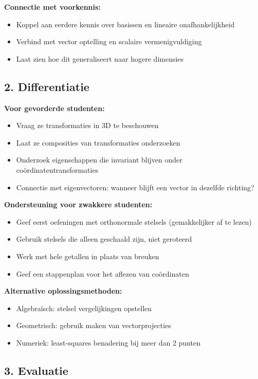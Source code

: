 \documentclass{ximera}
\begin{document}
\textbf{Connectie met voorkennis:}
\begin{itemize}
\item Koppel aan eerdere kennis over basissen en lineaire onafhankelijkheid
\item Verbind met vector optelling en scalaire vermenigvuldiging
\item Laat zien hoe dit generaliseert naar hogere dimensies
\end{itemize}

\subsection*{2. Differentiatie}

\textbf{Voor gevorderde studenten:}
\begin{itemize}
\item Vraag ze transformaties in 3D te beschouwen
\item Laat ze composities van transformaties onderzoeken
\item Onderzoek eigenschappen die invariant blijven onder coördinatentransformaties
\item Connectie met eigenvectoren: wanneer blijft een vector in dezelfde richting?
\end{itemize}

\textbf{Ondersteuning voor zwakkere studenten:}
\begin{itemize}
\item Geef eerst oefeningen met orthonormale stelsels (gemakkelijker af te lezen)
\item Gebruik stelsels die alleen geschaald zijn, niet geroteerd
\item Werk met hele getallen in plaats van breuken
\item Geef een stappenplan voor het aflezen van coördinaten
\end{itemize}

\textbf{Alternative oplossingsmethoden:}
\begin{itemize}
\item Algebraïsch: stelsel vergelijkingen opstellen
\item Geometrisch: gebruik maken van vectorprojecties
\item Numeriek: least-squares benadering bij meer dan 2 punten
\end{itemize}

\subsection*{3. Evaluatie}
\end{document}
